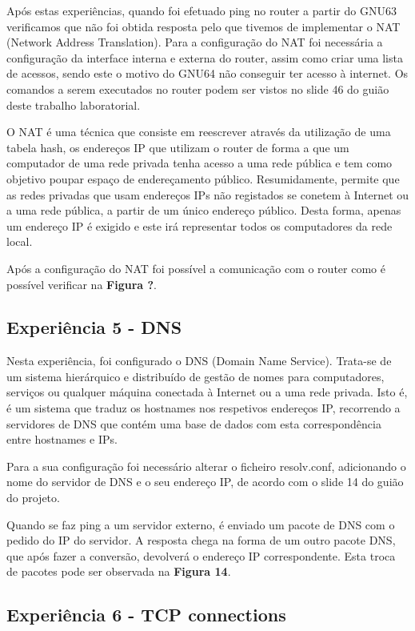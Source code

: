 \documentclass[article, a4paper, 11pt, oneside]{memoir}
\begin{document}
Após estas experiências, quando foi efetuado ping no router a partir do GNU63 verificamos que não foi obtida resposta pelo que tivemos de implementar o NAT (Network Address Translation). 
Para a configuração do NAT foi necessária a configuração da interface interna e externa do router, assim como criar uma lista de acessos, sendo este o motivo
do GNU64 não conseguir ter acesso à internet. Os comandos a serem executados no router podem ser vistos no slide 46 do guião deste trabalho laboratorial.

O NAT é uma técnica que consiste em reescrever através da utilização de uma tabela hash, 
os endereços IP que utilizam o router de forma a que
um computador de uma rede privada tenha acesso a uma rede pública e tem como objetivo poupar espaço de endereçamento público.
Resumidamente, permite que as redes privadas que usam endereços IPs não registados se conetem à Internet ou a uma rede pública,
a partir de um único endereço público. 
Desta forma, apenas um endereço IP é exigido e este irá representar todos os computadores da rede local.
 
Após a configuração do NAT foi possível a comunicação com o router como é possível verificar na \textbf{Figura ?}.

\subsection{Experiência 5 - DNS}			

Nesta experiência, foi configurado o DNS (Domain Name Service). Trata-se de um sistema hierárquico e distribuído de gestão 
de nomes para computadores, serviços ou qualquer máquina conectada à
 Internet ou a uma rede privada.
Isto é, é um sistema que traduz os hostnames nos respetivos endereços IP, 
recorrendo a servidores de DNS que contém uma base de dados com esta correspondência entre hostnames e IPs.

Para a sua configuração foi necessário alterar o ficheiro resolv.conf, 
adicionando o nome do servidor de DNS e o seu endereço IP, de acordo com o slide 14 do guião do projeto.

Quando se faz ping a um servidor externo, é enviado um pacote de DNS com o pedido do IP do servidor.
A resposta chega na forma de um outro pacote DNS, que após fazer a conversão, 
devolverá o endereço IP correspondente.
Esta troca de pacotes pode ser observada na \textbf{Figura 14}.

\subsection{Experiência 6 - TCP connections}
\end{document}
